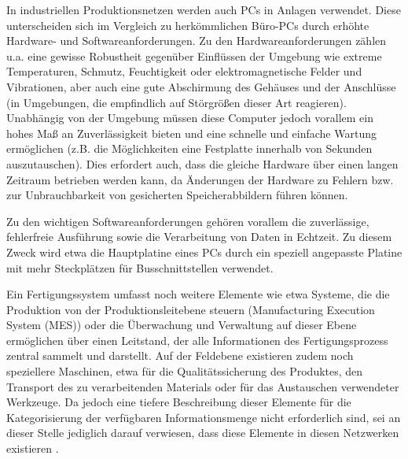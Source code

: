 In industriellen Produktionsnetzen werden auch PCs in Anlagen verwendet. Diese unterscheiden sich im Vergleich zu herkömmlichen Büro-PCs durch erhöhte Hardware- und Softwareanforderungen. Zu den Hardwareanforderungen zählen u.a. eine gewisse Robustheit gegenüber Einflüssen der Umgebung wie extreme Temperaturen, Schmutz, Feuchtigkeit oder elektromagnetische Felder und Vibrationen, aber auch eine gute Abschirmung des Gehäuses und der Anschlüsse (in Umgebungen, die empfindlich auf Störgrößen dieser Art reagieren). 
Unabhängig von der Umgebung müssen diese Computer jedoch vorallem ein hohes Maß an Zuverlässigkeit bieten und eine schnelle und einfache Wartung ermöglichen (z.B. die Möglichkeiten eine Festplatte innerhalb von Sekunden auszutauschen). Dies erfordert auch, dass die gleiche Hardware über einen langen Zeitraum betrieben werden kann, da Änderungen der Hardware zu Fehlern bzw. zur Unbrauchbarkeit von gesicherten Speicherabbildern führen können. 

Zu den wichtigen Softwareanforderungen gehören vorallem die zuverlässige, fehlerfreie Ausführung sowie die Verarbeitung von Daten in Echtzeit. Zu diesem Zweck wird etwa die Hauptplatine eines PCs durch ein speziell angepasste Platine mit mehr Steckplätzen für Busschnittstellen verwendet.

Ein Fertigungssystem umfasst noch weitere Elemente wie etwa Systeme, die die Produktion von der Produktionsleitebene steuern (Manufacturing Execution System (MES)) oder die Überwachung und Verwaltung auf dieser Ebene ermöglichen über einen Leitstand, der alle Informationen des Fertigungsprozess zentral sammelt und darstellt. Auf der Feldebene existieren zudem noch speziellere Maschinen, etwa für die Qualitätssicherung des Produktes, den Transport des zu verarbeitenden Materials oder für das Austauschen verwendeter Werkzeuge. Da jedoch eine tiefere Beschreibung dieser Elemente für die Kategorisierung der verfügbaren Informationsmenge nicht erforderlich sind, sei an dieser Stelle jediglich darauf verwiesen, dass diese Elemente in diesen Netzwerken existieren \citep{Hoenle2017}.

